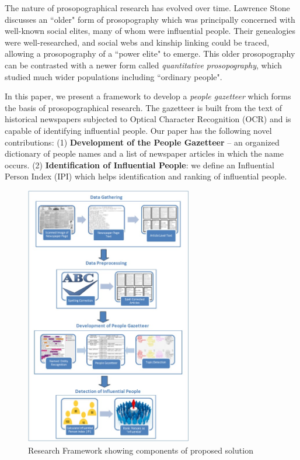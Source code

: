 \documentclass[10pt,journal,compsoc]{IEEEtran}
\begin{document}
The nature of prosopographical research has evolved over time. Lawrence Stone\cite{stone_71} discusses an ``older" form of prosopography which was principally concerned with well-known social elites, many of whom were influential people. Their genealogies were well-researched, and social webs and kinship linking could be traced, allowing a prosopography of a ``power elite" to emerge. This older prosopography can be contrasted with a newer form called \emph{quantitative prosopography}, which studied much wider populations including ``ordinary people". %

In this paper, we present a framework to develop a \textit{people gazetteer} which forms the basis of prosopographical research. The gazetteer is built from the text of historical newspapers subjected to Optical Character Recognition (OCR) and is capable of identifying influential people. Our paper has the following novel contributions: (1) \textbf{Development of the People Gazetteer} -- an organized dictionary of people names and a list of newspaper articles in which the name occurs. (2) \textbf{Identification of Influential People}: we define an Influential Person Index (IPI) which helps identification and ranking of influential people. 

\begin{figure}
\centering
\includegraphics[width=0.65\textwidth, height=0.6\textheight]{framework4}
\caption{Research Framework showing components of proposed solution}
\label{fig:framework}
\end{figure} 
\end{document}
